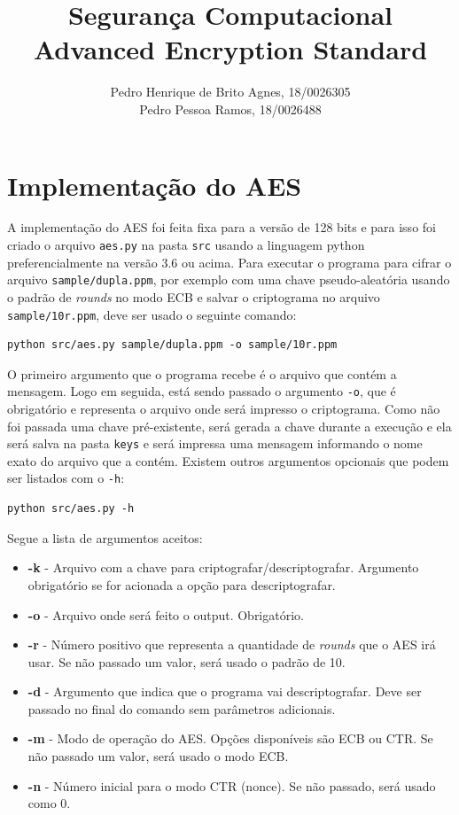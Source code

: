 \documentclass[12pt]{article}
\title{\textbf{Segurança Computacional\\ \Large{Advanced Encryption Standard}}}
\author{Pedro Henrique de Brito Agnes, 18/0026305 \\
Pedro Pessoa Ramos, 18/0026488}
\affil{Dep. Ciência da Computação - Universidade de Brasília (UnB) \vspace{-2ex}}
\date{}
\begin{document}
\maketitle

\section{Implementação do AES}
A implementação do AES foi feita fixa para a versão de 128 bits e para isso foi criado o arquivo \texttt{aes.py} na pasta \texttt{src} usando a linguagem python preferencialmente na versão 3.6 ou acima. Para executar o programa para cifrar o arquivo \texttt{sample/dupla.ppm}, por exemplo com uma chave pseudo-aleatória usando o padrão de \textit{rounds} no modo ECB e salvar o criptograma no arquivo \texttt{sample/10r.ppm}, deve ser usado o seguinte comando:

\begin{lstlisting}
python src/aes.py sample/dupla.ppm -o sample/10r.ppm
\end{lstlisting}

O primeiro argumento que o programa recebe é o arquivo que contém a mensagem. Logo em seguida, está sendo passado o argumento \texttt{-o}, que é obrigatório e representa o arquivo onde será impresso o criptograma. Como não foi passada uma chave pré-existente, será gerada a chave durante a execução e ela será salva na pasta \texttt{keys} e será impressa uma mensagem informando o nome exato do arquivo que a contém. Existem outros argumentos opcionais que podem ser listados com o \texttt{-h}:

\begin{lstlisting}
python src/aes.py -h
\end{lstlisting}

Segue a lista de argumentos aceitos:
\begin{itemize}
    \item \textbf{-k} - Arquivo com a chave para criptografar/descriptografar. Argumento obrigatório se for acionada a opção para descriptografar.
    \item \textbf{-o} - Arquivo onde será feito o output. Obrigatório.
    \item \textbf{-r} - Número positivo que representa a quantidade de \textit{rounds} que o AES irá usar. Se não passado um valor, será usado o padrão de 10.
    \item \textbf{-d} - Argumento que indica que o programa vai descriptografar. Deve ser passado no final do comando sem parâmetros adicionais.
    \item \textbf{-m} - Modo de operação do AES. Opções disponíveis são ECB ou CTR. Se não passado um valor, será usado o modo ECB.
    \item \textbf{-n} - Número inicial para o modo CTR (nonce). Se não passado, será usado como 0.
\end{itemize}
\end{document}

